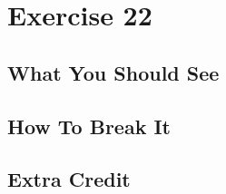 \chapter{Exercise 22}


\section{What You Should See}


\section{How To Break It}


\section{Extra Credit}



